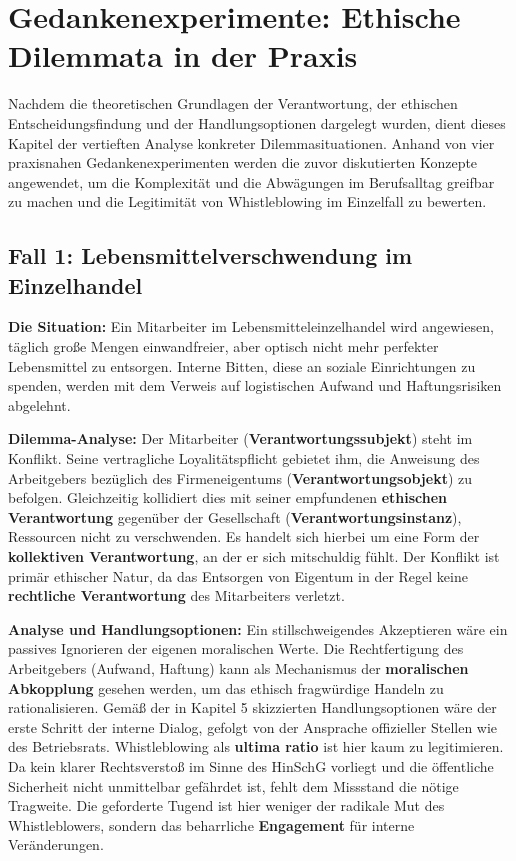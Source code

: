 \documentclass[
    12pt,               %
    a4paper,            %
    ngerman             %
]{scrartcl}
\begin{document}
\section{Gedankenexperimente: Ethische Dilemmata in der Praxis}

Nachdem die theoretischen Grundlagen der Verantwortung, der ethischen Entscheidungsfindung und der Handlungsoptionen dargelegt wurden, dient dieses Kapitel der vertieften Analyse konkreter Dilemmasituationen. Anhand von vier praxisnahen Gedankenexperimenten werden die zuvor diskutierten Konzepte angewendet, um die Komplexität und die Abwägungen im Berufsalltag greifbar zu machen und die Legitimität von Whistleblowing im Einzelfall zu bewerten.

\subsection{Fall 1: Lebensmittelverschwendung im Einzelhandel}

\textbf{Die Situation:} Ein Mitarbeiter im Lebensmitteleinzelhandel wird angewiesen, täglich große Mengen einwandfreier, aber optisch nicht mehr perfekter Lebensmittel zu entsorgen. Interne Bitten, diese an soziale Einrichtungen zu spenden, werden mit dem Verweis auf logistischen Aufwand und Haftungsrisiken abgelehnt.

\textbf{Dilemma-Analyse:}
Der Mitarbeiter (\textbf{Verantwortungssubjekt}) steht im Konflikt. Seine vertragliche Loyalitätspflicht gebietet ihm, die Anweisung des Arbeitgebers bezüglich des Firmeneigentums (\textbf{Verantwortungsobjekt}) zu befolgen. Gleichzeitig kollidiert dies mit seiner empfundenen \textbf{ethischen Verantwortung} gegenüber der Gesellschaft (\textbf{Verantwortungsinstanz}), Ressourcen nicht zu verschwenden. Es handelt sich hierbei um eine Form der \textbf{kollektiven Verantwortung}, an der er sich mitschuldig fühlt. Der Konflikt ist primär ethischer Natur, da das Entsorgen von Eigentum in der Regel keine \textbf{rechtliche Verantwortung} des Mitarbeiters verletzt.

\textbf{Analyse und Handlungsoptionen:}
Ein stillschweigendes Akzeptieren wäre ein passives Ignorieren der eigenen moralischen Werte. Die Rechtfertigung des Arbeitgebers (Aufwand, Haftung) kann als Mechanismus der \textbf{moralischen Abkopplung} gesehen werden, um das ethisch fragwürdige Handeln zu rationalisieren. Gemäß der in Kapitel 5 skizzierten Handlungsoptionen wäre der erste Schritt der interne Dialog, gefolgt von der Ansprache offizieller Stellen wie des Betriebsrats. Whistleblowing als \textbf{ultima ratio} ist hier kaum zu legitimieren. Da kein klarer Rechtsverstoß im Sinne des HinSchG vorliegt und die öffentliche Sicherheit nicht unmittelbar gefährdet ist, fehlt dem Missstand die nötige Tragweite. Die geforderte Tugend ist hier weniger der radikale Mut des Whistleblowers, sondern das beharrliche \textbf{Engagement} für interne Veränderungen.
\end{document}

